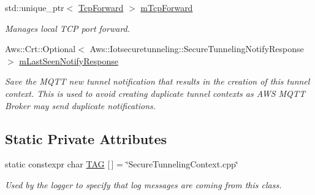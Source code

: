 \begin{DoxyCompactItemize}
\mbox{\label{class_aws_1_1_iot_1_1_device_client_1_1_secure_tunneling_1_1_secure_tunneling_context_a340b87ef9235822ac609a9ff62cd698d}} 
std\+::unique\+\_\+ptr$<$ \hyperlink{class_aws_1_1_iot_1_1_device_client_1_1_secure_tunneling_1_1_tcp_forward}{Tcp\+Forward} $>$ \hyperlink{class_aws_1_1_iot_1_1_device_client_1_1_secure_tunneling_1_1_secure_tunneling_context_a340b87ef9235822ac609a9ff62cd698d}{m\+Tcp\+Forward}
\begin{DoxyCompactList}\small\item\em Manages local T\+CP port forward. \end{DoxyCompactList}\item 
\mbox{\label{class_aws_1_1_iot_1_1_device_client_1_1_secure_tunneling_1_1_secure_tunneling_context_abb811790d7df9ec7d079f0e99626e912}} 
Aws\+::\+Crt\+::\+Optional$<$ Aws\+::\+Iotsecuretunneling\+::\+Secure\+Tunneling\+Notify\+Response $>$ \hyperlink{class_aws_1_1_iot_1_1_device_client_1_1_secure_tunneling_1_1_secure_tunneling_context_abb811790d7df9ec7d079f0e99626e912}{m\+Last\+Seen\+Notify\+Response}
\begin{DoxyCompactList}\small\item\em Save the M\+Q\+TT new tunnel notification that results in the creation of this tunnel context. This is used to avoid creating duplicate tunnel contexts as A\+WS M\+Q\+TT Broker may send duplicate notifications. \end{DoxyCompactList}\end{DoxyCompactItemize}
\subsection*{Static Private Attributes}
\begin{DoxyCompactItemize}
\item 
\mbox{\label{class_aws_1_1_iot_1_1_device_client_1_1_secure_tunneling_1_1_secure_tunneling_context_a28cc91d533330283781464efe5ce72c8}} 
static constexpr char \hyperlink{class_aws_1_1_iot_1_1_device_client_1_1_secure_tunneling_1_1_secure_tunneling_context_a28cc91d533330283781464efe5ce72c8}{T\+AG} \mbox{[}$\,$\mbox{]} = \char`\"{}Secure\+Tunneling\+Context.\+cpp\char`\"{}
\begin{DoxyCompactList}\small\item\em Used by the logger to specify that log messages are coming from this class. \end{DoxyCompactList}\end{DoxyCompactItemize}


